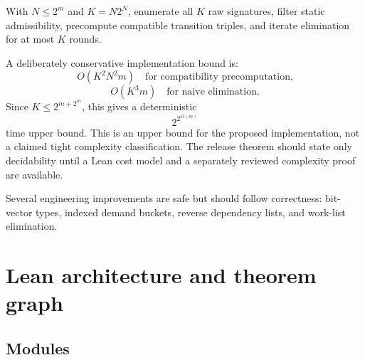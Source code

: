 \documentclass[11pt]{article}
\begin{document}
With $N\leq 2^m$ and $K=N2^N$, enumerate all $K$ raw signatures, filter static
admissibility, precompute compatible transition triples, and iterate elimination for at
most $K$ rounds.

A deliberately conservative implementation bound is:
\[
  O(K^2N^2m)\quad\text{for compatibility precomputation,}
\]
\[
  O(K^3m)\quad\text{for naive elimination.}
\]
Since $K\leq 2^{m+2^m}$, this gives a deterministic
\[
  2^{2^{O(m)}}
\]
time upper bound. This is an upper bound for the proposed implementation, not a claimed
tight complexity classification. The release theorem should state only decidability
until a Lean cost model and a separately reviewed complexity proof are available.

Several engineering improvements are safe but should follow correctness: bit-vector
types, indexed demand buckets, reverse dependency lists, and work-list elimination.

\section{Lean architecture and theorem graph}\label{sec:lean}

\subsection{Modules}
\end{document}
